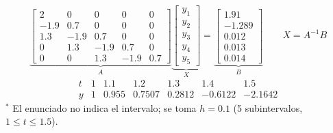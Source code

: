 \documentclass[11pt]{article}
\begin{document}
\[
\underbrace{\begin{bmatrix}
2 & 0 & 0 & 0 & 0\\
-1.9 & 0.7 & 0 & 0 & 0\\
1.3 & -1.9 & 0.7 & 0 & 0\\
0 & 1.3 & -1.9 & 0.7 & 0\\
0 & 0 & 1.3 & -1.9 & 0.7
\end{bmatrix}}_{A}
\underbrace{\begin{bmatrix} y_1\\ y_2\\ y_3\\ y_4\\ y_5\end{bmatrix}}_{X}
=
\underbrace{\begin{bmatrix} 1.91\\ -1.289\\ 0.012\\ 0.013\\ 0.014\end{bmatrix}}_{B}
\qquad X=A^{-1}B
\]
\[
\boxed{\begin{array}{c|cccccc}
t & 1 & 1.1 & 1.2 & 1.3 & 1.4 & 1.5\\\hline
y & 1 & 0.955 & 0.7507 & 0.2812 & -0.6122 & -2.1642
\end{array}}
\]
{\footnotesize $^{*}$ El enunciado no indica el intervalo; se toma $h=0.1$ (5 subintervalos, $1\le t\le1.5$).}
\end{document}
